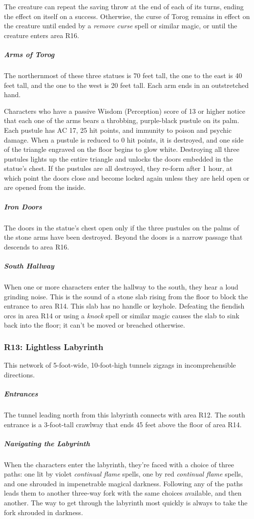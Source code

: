 \documentclass[10pt,a4paper,twoside,bg=print,twocolumn,openany,nodeprecatedcode]{dndbook}
\begin{document}
The creature can repeat the saving throw at the end of each of its turns, ending the effect on itself on a success. Otherwise, the curse of Torog remains in effect on the creature until ended by a \textit{remove curse} spell or similar magic, or until the creature enters area R16.

\subparagraph{Arms of Torog}
The northernmost of these three statues is 70 feet tall, the one to the east is 40 feet tall, and the one to the west is 20 feet tall. Each arm ends in an outstretched hand.

Characters who have a passive Wisdom (Perception) score of 13 or higher notice that each one of the arms bears a throbbing, purple-black pustule on its palm. Each pustule has AC 17, 25 hit points, and immunity to poison and psychic damage. When a pustule is reduced to 0 hit points, it is destroyed, and one side of the triangle engraved on the floor begins to glow white. Destroying all three pustules lights up the entire triangle and unlocks the doors embedded in the statue's chest. If the pustules are all destroyed, they re-form after 1 hour, at which point the doors close and become locked again unless they are held open or are opened from the inside.

\subparagraph{Iron Doors}
The doors in the statue's chest open only if the three pustules on the palms of the stone arms have been destroyed. Beyond the doors is a narrow passage that descends to area R16.

\subparagraph{South Hallway}
When one or more characters enter the hallway to the south, they hear a loud grinding noise. This is the sound of a stone slab rising from the floor to block the entrance to area R14. This slab has no handle or keyhole. Defeating the fiendish orcs in area R14 or using a \textit{knock} spell or similar magic causes the slab to sink back into the floor; it can't be moved or breached otherwise.

\subsubsection{R13: Lightless Labyrinth}
This network of 5-foot-wide, 10-foot-high tunnels zigzags in incomprehensible directions.

\subparagraph{Entrances}
The tunnel leading north from this labyrinth connects with area R12. The south entrance is a 3-foot-tall crawlway that ends 45 feet above the floor of area R14.

\subparagraph{Navigating the Labyrinth}
When the characters enter the labyrinth, they're faced with a choice of three paths: one lit by violet \textit{continual flame} spells, one by red \textit{continual flame} spells, and one shrouded in impenetrable magical darkness. Following any of the paths leads them to another three-way fork with the same choices available, and then another. The way to get through the labyrinth most quickly is always to take the fork shrouded in darkness.
\end{document}
